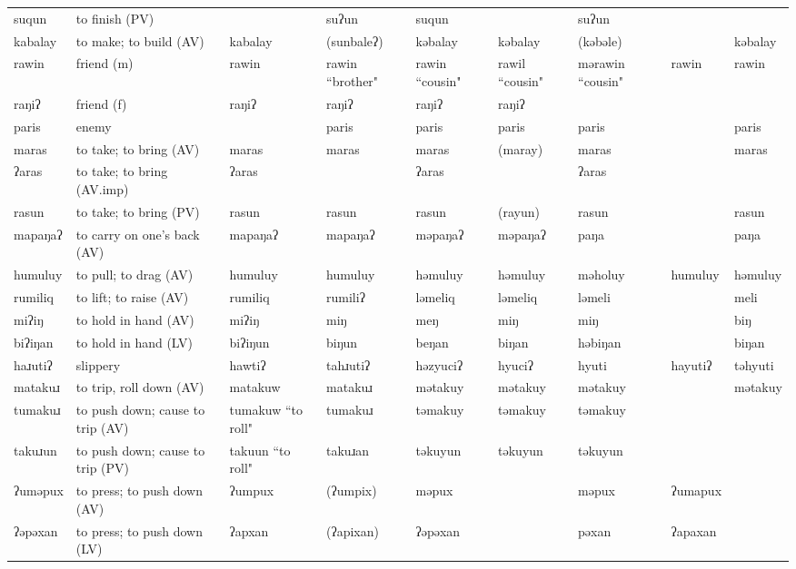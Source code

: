 \begin{landscape}
\begin{longtable}{*{9}{p{}}}
\text{*}suqun & to finish (PV) &  & suʔun & suqun &  & suʔun &  & \\
\text{*}kabalay & to make; to build (AV) & kabalay & (sunbaleʔ) & kəbalay & kəbalay & (kəbəle) &  & kəbalay\\
\text{*}rawin & friend (m) & rawin & rawin ``brother" & rawin ``cousin" & rawil ``cousin" & mərawin ``cousin" & rawin & rawin\\
\text{*}raŋiʔ & friend (f) & raŋiʔ & raŋiʔ & raŋiʔ & raŋiʔ &  &  & \\
\text{*}paris & enemy &  & paris & paris & paris & paris &  & paris\\
\text{*}maras & to take; to bring (AV) & maras & maras & maras & (maray) & maras &  & maras\\
\text{*}ʔaras & to take; to bring (AV.imp) & ʔaras &  & ʔaras &  & ʔaras &  & \\
\text{*}rasun & to take; to bring (PV) & rasun & rasun & rasun & (rayun) & rasun &  & rasun\\
\text{*}mapaŋaʔ & to carry on one's back (AV) & mapaŋaʔ & mapaŋaʔ & məpaŋaʔ & məpaŋaʔ & paŋa &  & paŋa\\
\text{*}humuluy & to pull; to drag (AV) & humuluy & humuluy & həmuluy & həmuluy & məholuy & humuluy & həmuluy\\
\text{*}rumiliq & to lift; to raise (AV) & rumiliq & rumiliʔ & ləmeliq & ləmeliq & ləmeli &  & meli\\
\text{*}miʔiŋ & to hold in hand (AV) & miʔiŋ & miŋ & meŋ & miŋ & miŋ &  & biŋ\\
\text{*}biʔiŋan & to hold in hand (LV) & biʔiŋun & biŋun & beŋan & biŋan & həbiŋan &  & biŋan\\
\text{*}haɹutiʔ & slippery & hawtiʔ & tahɹutiʔ & həzyuciʔ & hyuciʔ & hyuti & hayutiʔ & təhyuti\\
\text{*}matakuɹ & to trip, roll down (AV) & matakuw & matakuɹ & mətakuy & mətakuy & mətakuy &  & mətakuy\\
\text{*}tumakuɹ & to push down; cause to trip (AV) & tumakuw ``to roll" & tumakuɹ & təmakuy & təmakuy & təmakuy &  & \\
\text{*}takuɹun & to push down; cause to trip (PV) & takuun ``to roll" & takuɹan & təkuyun & təkuyun & təkuyun &  & \\
\text{*}ʔuməpux & to press; to push down (AV) & ʔumpux & (ʔumpix) & məpux &  & məpux & ʔumapux & \\
\text{*}ʔəpəxan & to press; to push down (LV) & ʔapxan & (ʔapixan) & ʔəpəxan &  & pəxan & ʔapaxan & \\

\end{longtable}
\end{landscape}
